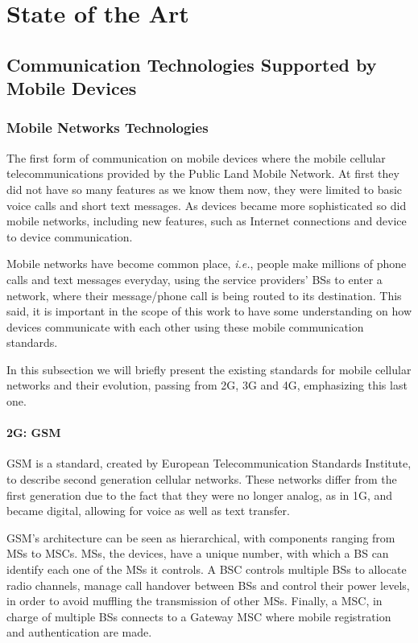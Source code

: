 \chapter{State of the Art}
\label{chapter:soa}

\section{Communication Technologies Supported by Mobile Devices}
\label{sec:commtec}

\subsection{Mobile Networks Technologies}
\label{subsection:mobtec}

The first form of communication on mobile devices where the mobile cellular telecommunications provided by the Public Land Mobile Network. At first they did not have so many features as we know them now, they were limited to basic voice calls and short text messages. As devices became more sophisticated so did mobile networks, including new features, such as Internet connections and device to device communication.

Mobile networks have become common place, \textit{i.e.}, people make millions of phone calls and text messages everyday, using the service providers' \glspl{BS} to enter a network, where their message/phone call is being routed to its destination. This said, it is important in the scope of this work to have some understanding on how devices communicate with each other using these mobile communication standards.

In this subsection we will briefly present the existing standards for mobile cellular networks and their evolution, passing from 2G, 3G and 4G, emphasizing this last one.

\subsubsection{2G: GSM}

\gls{GSM} is a standard, created by European Telecommunication Standards Institute, to describe second generation cellular networks. These networks differ from the first generation due to the fact that they were no longer analog, as in 1G, and became digital, allowing for voice as well as text transfer.

\gls{GSM}'s architecture can be seen as hierarchical, with components ranging from \glspl{MS} to \glspl{MSC}. \glspl{MS}, the devices, have a unique number, with which a \gls{BS} can identify each one of the \glspl{MS} it controls. A \gls{BSC} controls multiple \glspl{BS} to allocate radio channels, manage call handover between \glspl{BS} and control their power levels, in order to avoid muffling the transmission of other \glspl{MS}. Finally, a \gls{MSC}, in charge of multiple \glspl{BS} connects to a Gateway \gls{MSC} where mobile registration and authentication are made.

